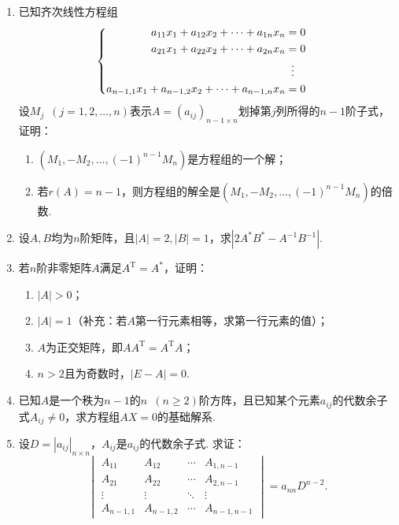 \begin{enumerate}
    \item 已知齐次线性方程组
          \[\begin{cases} \begin{aligned}
                      a_{11}x_1+a_{12}x_2+\cdots+a_{1n}x_n          & = 0             \\
                      a_{21}x_1+a_{22}x_2+\cdots+a_{2n}x_n          & = 0             \\
                                                                    & \vdotswithin{=} \\
                      a_{n-1,1}x_1+a_{n-1,2}x_2+\cdots+a_{n-1,n}x_n & = 0
                  \end{aligned} \end{cases}\]
          设$M_j\enspace(j=1,2,\ldots,n)$表示$A=(a_{ij})_{n-1 \times n}$划掉第$j$列所得的$n-1$阶子式，证明：
          \begin{enumerate}
              \item $(M_1,-M_2,\ldots,(-1)^{n-1}M_n)$是方程组的一个解；

              \item 若$r(A)=n-1$，则方程组的解全是$(M_1,-M_2,\ldots,(-1)^{n-1}M_n)$的倍数.
          \end{enumerate}

    \item 设$A,B$均为$n$阶矩阵，且$|A|=2,|B|=1$，求$|2A^*B^*-A^{-1}B^{-1}|$.

    \item 若$n$阶非零矩阵$A$满足$A^\mathrm{T}=A^*$，证明：
          \begin{enumerate}
              \item $|A|>0$；

              \item $|A|=1$（补充：若$A$第一行元素相等，求第一行元素的值）；

              \item $A$为正交矩阵，即$AA^\mathrm{T}=A^\mathrm{T}A$；

              \item $n>2$且为奇数时，$|E-A|=0$.
          \end{enumerate}

    \item 已知$A$是一个秩为$n-1$的$n\enspace(n \geqslant 2)$阶方阵，且已知某个元素$a_{ij}$的代数余子式$A_{ij} \neq 0$，求方程组$AX=0$的基础解系.

    \item 设$D=|a_{ij}|_{n \times n}$，$A_{ij}$是$a_{ij}$的代数余子式. 求证：
          \[\begin{vmatrix}
                  A_{11}    & A_{12}    & \cdots & A_{1,n-1}   \\
                  A_{21}    & A_{22}    & \cdots & A_{2,n-1}   \\
                  \vdots    & \vdots    & \ddots & \vdots      \\
                  A_{n-1,1} & A_{n-1,2} & \cdots & A_{n-1,n-1}
              \end{vmatrix}=a_{nn}D^{n-2}.\]


\end{enumerate}
